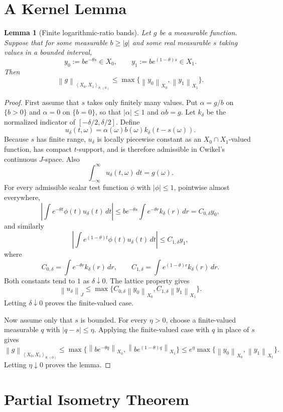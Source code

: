 \documentclass[11pt]{article}
\newtheorem{lemma}{Lemma}
\newcommand{\PM}{\left\langle X_0,X_1\right\rangle_{\theta,(0)}}
\newcommand{\norm}[1]{\left\lVert #1\right\rVert}
\begin{document}
\section*{A Kernel Lemma}

\begin{lemma}[Finite logarithmic-ratio bands]
\label{lem:finite-band}
Let $g$ be a measurable function.  Suppose that for some measurable
$b\ge |g|$ and some real measurable $s$ taking values in a bounded
interval,
\[
y_0:=b e^{-\theta s}\in X_0,\qquad
y_1:=b e^{(1-\theta)s}\in X_1 .
\]
Then
\[
\norm{g}_{\PM}\le \max\{\norm{y_0}_{X_0},\norm{y_1}_{X_1}\}.
\]
\end{lemma}

\begin{proof}
First assume that $s$ takes only finitely many values.  Put
$\alpha=g/b$ on $\{b>0\}$ and $\alpha=0$ on $\{b=0\}$, so that
$|\alpha|\le 1$ and $\alpha b=g$.  Let $k_\delta$ be the normalized
indicator of $[-\delta/2,\delta/2]$.  Define
\[
u_\delta(t,\omega)=\alpha(\omega)b(\omega)k_\delta(t-s(\omega)).
\]
Because $s$ has finite range, $u_\delta$ is locally piecewise constant
as an $X_0\cap X_1$-valued function, has compact $t$-support, and is
therefore admissible in Cwikel's continuous $J$-space.  Also
\[
\int_{-\infty}^{\infty}u_\delta(t,\omega)\,dt=g(\omega).
\]
For every admissible scalar test function $\phi$ with $|\phi|\le 1$,
pointwise almost everywhere,
\[
\left|\int e^{-\theta t}\phi(t)u_\delta(t)\,dt\right|
\le
b e^{-\theta s}\int e^{-\theta r}k_\delta(r)\,dr
= C_{0,\delta}y_0,
\]
and similarly
\[
\left|\int e^{(1-\theta)t}\phi(t)u_\delta(t)\,dt\right|
\le
C_{1,\delta}y_1,
\]
where
\[
C_{0,\delta}=\int e^{-\theta r}k_\delta(r)\,dr,\qquad
C_{1,\delta}=\int e^{(1-\theta)r}k_\delta(r)\,dr .
\]
Both constants tend to $1$ as $\delta\downarrow0$.  The lattice
property gives
\[
\norm{u_\delta}_{J}
\le
\max\{C_{0,\delta}\norm{y_0}_{X_0},
      C_{1,\delta}\norm{y_1}_{X_1}\}.
\]
Letting $\delta\downarrow0$ proves the finite-valued case.

Now assume only that $s$ is bounded.  For every $\eta>0$, choose a
finite-valued measurable $q$ with $|q-s|\le \eta$.  Applying the
finite-valued case with $q$ in place of $s$ gives
\[
\norm{g}_{\PM}
\le
\max\{\norm{b e^{-\theta q}}_{X_0},
      \norm{b e^{(1-\theta)q}}_{X_1}\}
\le
e^\eta\max\{\norm{y_0}_{X_0},\norm{y_1}_{X_1}\}.
\]
Letting $\eta\downarrow0$ proves the lemma.
\end{proof}

\section*{Partial Isometry Theorem}
\end{document}
